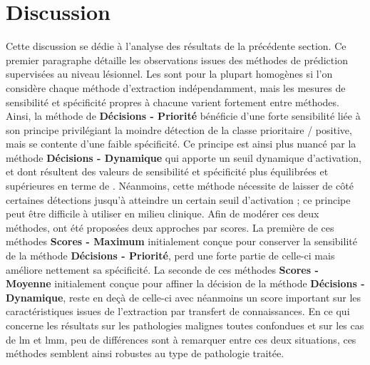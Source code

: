 \section{Discussion}
Cette discussion se dédie à l'analyse des résultats de la précédente section. Ce premier paragraphe détaille les observations issues des méthodes de prédiction supervisées au niveau lésionnel. Les \fscore{} sont pour la plupart homogènes si l'on considère chaque méthode d'extraction indépendamment, mais les mesures de sensibilité et spécificité propres à chacune varient fortement entre méthodes. Ainsi, la méthode de \textbf{Décisions - Priorité} bénéficie d'une forte sensibilité liée à son principe privilégiant la moindre détection de la classe prioritaire / positive, mais se contente d'une faible spécificité. Ce principe est ainsi plus nuancé par la méthode \textbf{Décisions - Dynamique} qui apporte un seuil dynamique d'activation, et dont résultent des valeurs de sensibilité et spécificité plus équilibrées et supérieures en terme de \fscore{}. Néanmoins, cette méthode nécessite de laisser de côté certaines détections jusqu'à atteindre un certain seuil d'activation ; ce principe peut être difficile à utiliser en milieu clinique. Afin de modérer ces deux méthodes, ont été proposées deux approches par scores. La première de ces méthodes \textbf{Scores - Maximum} initialement conçue pour conserver la sensibilité de la méthode \textbf{Décisions - Priorité}, perd une forte partie de celle-ci mais améliore nettement sa spécificité. La seconde de ces méthodes \textbf{Scores - Moyenne} initialement conçue pour affiner la décision de la méthode \textbf{Décisions - Dynamique}, reste en deçà de celle-ci avec néanmoins un score important sur les caractéristiques issues de l'extraction par transfert de connaissances. En ce qui concerne les résultats sur les pathologies malignes toutes confondues et sur les cas de \gls{lm} et \gls{lmm}, peu de différences sont à remarquer entre ces deux situations, ces méthodes semblent ainsi robustes au type de pathologie traitée.\par

